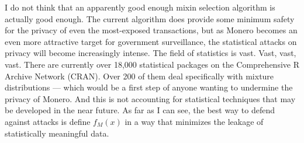 \documentclass[english]{paper}
\begin{document}
I do not think that an apparently \textquotedbl good enough\textquotedbl{}
mixin selection algorithm is actually good enough. The current algorithm
does provide some minimum safety for the privacy of even the most-exposed
transactions, but as Monero becomes an even more attractive target
for government surveillance, the statistical attacks on privacy will
become increasingly intense. The field of statistics is vast. Vast,
vast, vast. There are currently over 18,000 statistical packages on
the Comprehensive R Archive Network (CRAN). Over 200 of them deal
specifically with mixture distributions --- which would be a first
step of anyone wanting to undermine the privacy of Monero. And this
is not accounting for statistical techniques that may be developed
in the near future. As far as I can see, the best way to defend against
attacks is define $f_{M}(x)$ in a way that minimizes the leakage
of statistically meaningful data.\\

\noindent{}\\

\noindent{}
\end{document}
